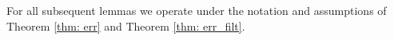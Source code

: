 \documentclass[conference]{IEEEtran}
\begin{document}





For all subsequent lemmas we operate under the notation and assumptions of Theorem \ref{thm: err} and Theorem \ref{thm: err_filt}. 
\end{document}
